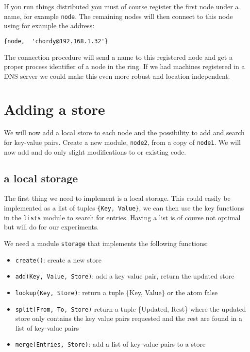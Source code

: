 \documentclass[a4paper,11pt]{article}
\begin{document}
If you run things distributed you must of course register the first
node under a name, for example {\tt node}. The remaining nodes will
then connect to this node using for example the address: 

\begin{verbatim}
{node,  'chordy@192.168.1.32'}
\end{verbatim}

The connection procedure will send a name to this registered node and
get a proper process identifier of a node in the ring. If we had
machines registered in a DNS server we could make this even more
robust and location independent.

\section{Adding a store}

We will now add a local store to each node and the possibility to add
and search for key-value pairs. Create a new module, {\tt node2}, from
a copy of {\tt node1}. We will now add and do only slight
modifications to or existing code.

\subsection{a local storage}

The first thing we need to implement is a local storage. This could
easily be implemented as a list of tuples {\tt \{Key, Value\}}, we can
then use the key functions in the {\tt lists} module to search for
entries. Having a list is of course not optimal but will do for our
experiments.

We need a module {\tt storage} that implements the following functions: 

\begin{itemize}
 \item {\tt create()}: create a new store
 \item {\tt add(Key, Value, Store)}:  add a key value pair, return the updated store
 \item {\tt lookup(Key, Store)}: return a tuple \{Key, Value\} or the atom false

 \item {\tt split(From, To, Store)} return a tuple \{Updated, Rest\} where the updated store only contains the key value pairs requested and the rest are found in a list of key-value pairs

 \item {\tt merge(Entries, Store)}: add a list of key-value pairs to a store
\end{itemize}
\end{document}
